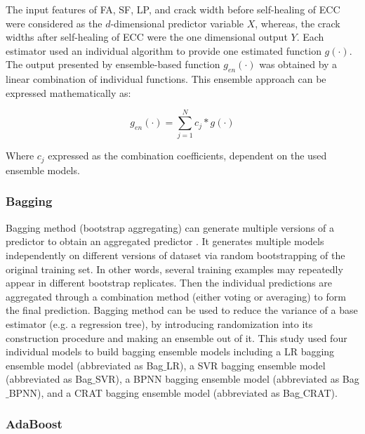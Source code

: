 \documentclass[11pt]{article}
\begin{document}
	The input features of FA, SF, LP, and crack width before self-healing of ECC were considered as the $d$-dimensional predictor variable $X$, whereas, the crack widths after self-healing of ECC were the one dimensional output $Y$.  Each estimator used an individual algorithm to provide one estimated function $g(\cdot)$. The output presented by ensemble-based function $g_{en}(\cdot)$ was obtained by a linear combination of individual functions. This ensemble approach can be expressed mathematically as:
	
	\begin{equation}
	g_{en}(\cdot) = \sum_{j=1}^{N}c_j *g(\cdot)
	\end{equation}
	
	Where $c_j$ expressed as the combination coefficients, dependent on the used ensemble models.  
	
	\subsubsection{Bagging}
	Bagging method (bootstrap aggregating) can generate multiple versions of a predictor to obtain an aggregated predictor \cite{breiman1996bagging}. It generates multiple models independently on different versions of dataset via random bootstrapping of the original training set. In other words, several training examples may repeatedly appear in different bootstrap replicates. Then the individual predictions are aggregated through a combination method (either voting or averaging) to form the final prediction. Bagging method can be used to reduce the variance of a base estimator (e.g. a regression tree), by introducing randomization into its construction procedure and making an ensemble out of it.
This study used four individual models to build bagging ensemble models including a LR bagging ensemble model (abbreviated as Bag$\_$LR), a SVR bagging ensemble model (abbreviated as Bag$\_$SVR), a BPNN bagging ensemble model (abbreviated as Bag$\_$BPNN), and a CRAT bagging ensemble model (abbreviated as Bag$\_$CRAT).


	
	\subsubsection{AdaBoost}
\end{document}
